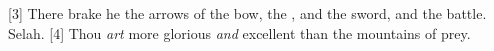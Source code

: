 [3] \textcolor[cmyk]{0.99998,1,0,0}{There brake he the arrows of the bow, the , and the sword, and the battle. Selah.}
[4] \textcolor[cmyk]{0.99998,1,0,0}{Thou \emph{art} more glorious \emph{and} excellent than the mountains of prey.} %
